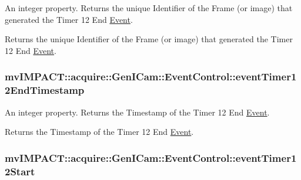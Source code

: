 An integer property. Returns the unique Identifier of the Frame (or image) that generated the Timer 12 End \hyperlink{classmv_i_m_p_a_c_t_1_1acquire_1_1_event}{Event}. 

Returns the unique Identifier of the Frame (or image) that generated the Timer 12 End \hyperlink{classmv_i_m_p_a_c_t_1_1acquire_1_1_event}{Event}. \hypertarget{classmv_i_m_p_a_c_t_1_1acquire_1_1_gen_i_cam_1_1_event_control_a23d485af97786fcf1bac6fbb3b82b9e9}{
\subsubsection[{event\+Timer12\+End\+Timestamp}]{ mv\+I\+M\+P\+A\+C\+T\+::acquire\+::\+Gen\+I\+Cam\+::\+Event\+Control\+::event\+Timer12\+End\+Timestamp}}\label{classmv_i_m_p_a_c_t_1_1acquire_1_1_gen_i_cam_1_1_event_control_a23d485af97786fcf1bac6fbb3b82b9e9}


An integer property. Returns the Timestamp of the Timer 12 End \hyperlink{classmv_i_m_p_a_c_t_1_1acquire_1_1_event}{Event}. 

Returns the Timestamp of the Timer 12 End \hyperlink{classmv_i_m_p_a_c_t_1_1acquire_1_1_event}{Event}. \hypertarget{classmv_i_m_p_a_c_t_1_1acquire_1_1_gen_i_cam_1_1_event_control_a9628c8d346b0423cebd365acb6e5a27a}{
\subsubsection[{event\+Timer12\+Start}]{ mv\+I\+M\+P\+A\+C\+T\+::acquire\+::\+Gen\+I\+Cam\+::\+Event\+Control\+::event\+Timer12\+Start}}\label{classmv_i_m_p_a_c_t_1_1acquire_1_1_gen_i_cam_1_1_event_control_a9628c8d346b0423cebd365acb6e5a27a}



